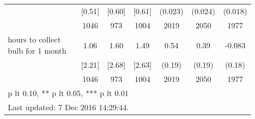 \begin{table}[htbp]
\begin{tabular*}{1\hsize}{@{\hskip\tabcolsep\extracolsep\fill}l*{1}{cccccc}}
                                &   [0.51]&   [0.60]&   [0.61]&  (0.023)         &  (0.024)         &  (0.018)         \\
                                &     1046&      973&     1004&     2019         &     2050         &     1977         \\
hours to collect bulb for 1 month&     1.06&     1.60&     1.49&     0.54\sym{***}&     0.39\sym{**} &   -0.083         \\
                                &   [2.21]&   [2.68]&   [2.63]&   (0.19)         &   (0.19)         &   (0.18)         \\
                                &     1046&      973&     1004&     2019         &     2050         &     1977         \\
\bottomrule
\multicolumn{7}{l}{\footnotesize * p lt 0.10, ** p lt 0.05, *** p lt 0.01}\\
\multicolumn{7}{l}{\footnotesize Last updated:  7 Dec 2016 14:29:44.}\\
\end{tabular*}
\end{table}
